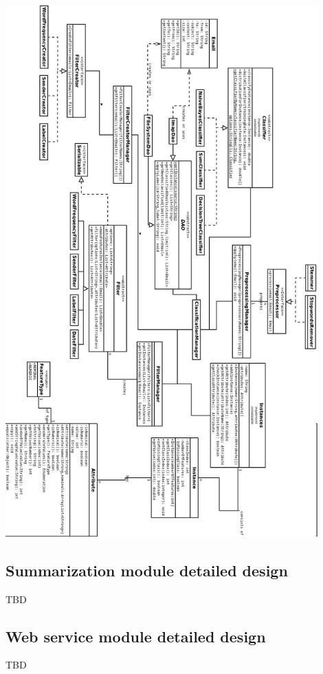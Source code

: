 \documentclass[12pt]{article}
\begin{document}
\includegraphics[width=12cm]{design.jpeg}\\



\subsection{Summarization module detailed design}
TBD

\subsection{Web service module detailed design}
TBD
\end{document}
